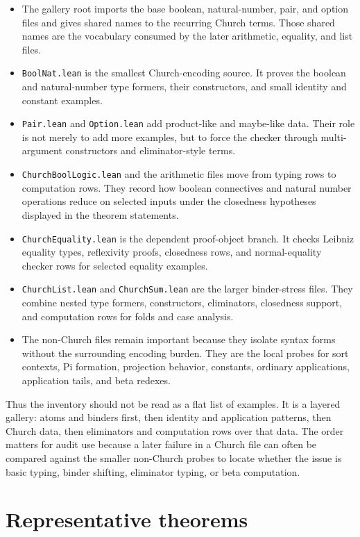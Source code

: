 \begin{itemize}
\item The gallery root imports the base boolean, natural-number, pair, and
  option files and gives shared names to the recurring Church terms. Those
  shared names are the vocabulary consumed by the later arithmetic, equality,
  and list files.
\item \texttt{BoolNat.lean} is the smallest Church-encoding source. It proves
  the boolean and natural-number type formers, their constructors, and small
  identity and constant examples.
\item \texttt{Pair.lean} and \texttt{Option.lean} add product-like and
  maybe-like data. Their role is not merely to add more examples, but to force
  the checker through multi-argument constructors and eliminator-style terms.
\item \texttt{ChurchBoolLogic.lean} and the arithmetic files move from typing
  rows to computation rows. They record how boolean connectives and natural
  number operations reduce on selected inputs under the closedness hypotheses
  displayed in the theorem statements.
\item \texttt{ChurchEquality.lean} is the dependent proof-object branch. It
  checks Leibniz equality types, reflexivity proofs, closedness rows, and
  normal-equality checker rows for selected equality examples.
\item \texttt{ChurchList.lean} and \texttt{ChurchSum.lean} are the larger
  binder-stress files. They combine nested type formers, constructors,
  eliminators, closedness support, and computation rows for folds and case
  analysis.
\item The non-Church files remain important because they isolate syntax forms
  without the surrounding encoding burden. They are the local probes for sort
  contexts, Pi formation, projection behavior, constants, ordinary
  applications, application tails, and beta redexes.
\end{itemize}

Thus the inventory should not be read as a flat list of examples. It is a
layered gallery: atoms and binders first, then identity and application
patterns, then Church data, then eliminators and computation rows over that
data. The order matters for audit use because a later failure in a Church file
can often be compared against the smaller non-Church probes to locate whether
the issue is basic typing, binder shifting, eliminator typing, or beta
computation.

\section{Representative theorems}
\label{sec:metacic-typedexamples-audit-map-representative-theorems}

